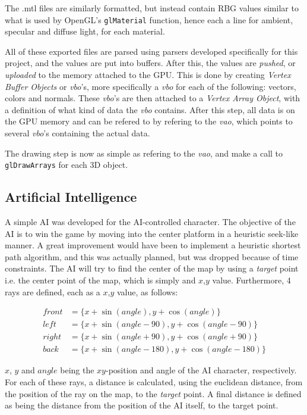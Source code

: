 \documentclass[12pt,a4paper,titlepage]{article}
\begin{document}
The .mtl files are similarly formatted, but instead contain RBG values
similar to what is used by OpenGL's \texttt{glMaterial} function, hence each a line
for ambient, specular and diffuse light, for each material.

All of these exported files are parsed using parsers developed specifically
for this project, and the values are put into buffers. After this, the values
are \emph{pushed}, or \emph{uploaded} to the memory attached to the GPU. This is done by creating
\emph{Vertex Buffer Objects} or \emph{vbo}'s, more specifically a \emph{vbo} for each of the
following: vectors, colors and normals.  These \emph{vbo}'s are then attached to a
\emph{Vertex Array Object}, with a definition of what kind of data the \emph{vbo}
contains. After this step, all data is on the GPU memory and can be refered
to by refering to the \emph{vao}, which points to several \emph{vbo}'s containing the
actual data.

The drawing step is now as simple as refering to the \emph{vao}, and make a call
to \texttt{glDrawArrays} for each 3D object.

\subsection*{Artificial Intelligence}
\label{sec-2-3}
A simple AI was developed for the AI-controlled character. The objective of the
AI is to win the game by moving into the center platform in a heuristic seek-like
manner. A great improvement would have been to implement a heuristic shortest
path algorithm, and this was actually planned, but was dropped because of
time constraints. The AI will try to find the center of the map by using a
\emph{target} point i.e. the center point of the map, which is simply and $x$,$y$
value. Furthermore, 4 rays are defined, each as a $x$,$y$ value, as follows:

\begin{align*}
front &= \{x + \sin(angle), y + \cos(angle)\}\\
left &= \{x + \sin(angle-90),  y + \cos(angle-90)\}\\
right &= \{x + \sin(angle+90), y + \cos(angle+90)\}\\
back &= \{x + \sin(angle-180), y + \cos(angle-180)\}
\end{align*}

$x$, $y$ and $angle$ being the $xy$-position and angle of the AI character,
respectively. For each of these rays, a distance is calculated, using the
euclidean distance, from the position of the ray on the map, to the \emph{target}
point. A final distance is defined as being the distance from the position of
the AI itself, to the target point.
\end{document}
